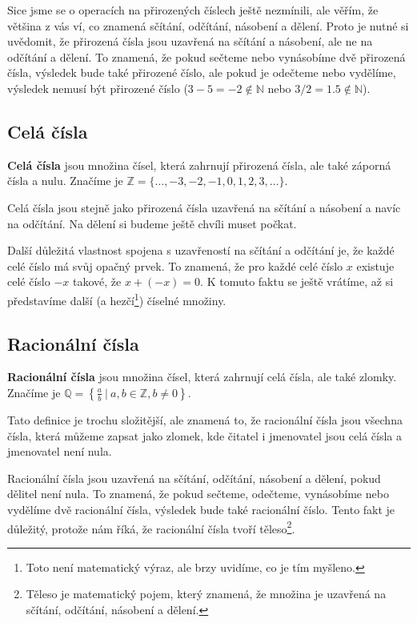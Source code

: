 \begin{note}
  Sice jsme se o operacích na přirozených číslech ještě nezmínili, ale věřím, že většina z vás ví, co znamená sčítání, odčítání, násobení a dělení. Proto je nutné si uvědomit, že přirozená čísla jsou uzavřená na sčítání a násobení, ale ne na odčítání a dělení. To znamená, že pokud sečteme nebo vynásobíme dvě přirozená čísla, výsledek bude také přirozené číslo, ale pokud je odečteme nebo vydělíme, výsledek nemusí být přirozené číslo ($3-5 = -2 \not\in\mathbb{N}$ nebo $3/2 = 1.5 \not\in\mathbb{N}$).
\end{note}

\subsection{Celá čísla}
\begin{definitionbox}
  \textbf{Celá čísla} jsou množina čísel, která zahrnují přirozená čísla, ale také záporná čísla a nulu. Značíme je $\mathbb{Z} = \{\ldots, -3, -2, -1, 0, 1, 2, 3, \ldots\}$.
\end{definitionbox}

\begin{note}
  Celá čísla jsou stejně jako přirozená čísla uzavřená na sčítání a násobení a navíc na odčítání. Na dělení si budeme ještě chvíli muset počkat.
\end{note}

\begin{note}
  Další důležitá vlastnost spojena s uzavřeností na sčítání a odčítání je, že každé celé číslo má svůj opačný prvek. To znamená, že pro každé celé číslo $x$ existuje celé číslo $-x$ takové, že $x + (-x) = 0$. K tomuto faktu se ještě vrátíme, až si představíme další (a hezčí\footnote{Toto není matematický výraz, ale brzy uvidíme, co je tím myšleno.}) číselné množiny.
\end{note}

\subsection{Racionální čísla}
\begin{definitionbox}
  \textbf{Racionální čísla} jsou množina čísel, která zahrnují celá čísla, ale také zlomky. Značíme je $\mathbb{Q} = \left\{\frac{a}{b}\ |\ a, b\in\mathbb{Z}, b\neq 0\right\}$.\ \vspace{2mm}

  Tato definice je trochu složitější, ale znamená to, že racionální čísla jsou všechna čísla, která můžeme zapsat jako zlomek, kde čitatel i jmenovatel jsou celá čísla a jmenovatel není nula. 
\end{definitionbox}

\begin{note}
  Racionální čísla jsou uzavřená na sčítání, odčítání, násobení a dělení, pokud dělitel není nula. To znamená, že pokud sečteme, odečteme, vynásobíme nebo vydělíme dvě racionální čísla, výsledek bude také racionální číslo. Tento fakt je důležitý, protože nám říká, že racionální čísla tvoří těleso\footnote{Těleso je matematický pojem, který znamená, že množina je uzavřená na sčítání, odčítání, násobení a dělení.}.
\end{note}